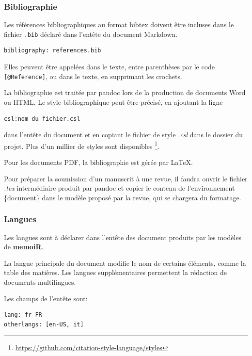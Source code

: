 \documentclass[
  12pt,
  french,
  a4paper,
  extrafontsizes,onecolumn,openright
  ]{memoir}
\begin{document}
\hypertarget{bibliographie}{%
\subsubsection{Bibliographie}\label{bibliographie}}

Les références bibliographiques au format bibtex doivent être incluses dans le fichier \texttt{.bib} déclaré dans l'entête du document Markdown.

\begin{verbatim}
bibliography: references.bib
\end{verbatim}

Elles peuvent être appelées dans le texte, entre parenthèses par le code \texttt{{[}@Reference{]}}, ou dans le texte, en supprimant les crochets.

La bibliographie est traitée par pandoc lors de la production de documents Word ou HTML.
Le style bibliographique peut être précisé, en ajoutant la ligne

\begin{verbatim}
csl:nom_du_fichier.csl
\end{verbatim}

dans l'entête du document et en copiant le fichier de style \emph{.csl} dans le dossier du projet.
Plus d'un millier de styles sont disponibles \footnote{\url{https://github.com/citation-style-language/styles}}.

Pour les documents PDF, la bibliographie est gérée par LaTeX.

Pour préparer la soumission d'un manuscrit à une revue, il faudra ouvrir le fichier \emph{.tex} intermédiaire produit par pandoc et copier le contenu de l'environnement \{document\} dans le modèle proposé par la revue, qui se chargera du formatage.

\hypertarget{langues}{%
\subsubsection{Langues}\label{langues}}

Les langues sont à déclarer dans l'entête des document produits par les modèles de \textbf{memoiR}.

La langue principale du document modifie le nom de certains éléments, comme la table des matières.
Les langues supplémentaires permettent la rédaction de documents multilingues.

Les champs de l'entête sont:

\begin{verbatim}
lang: fr-FR
otherlangs: [en-US, it]
\end{verbatim}
\end{document}
